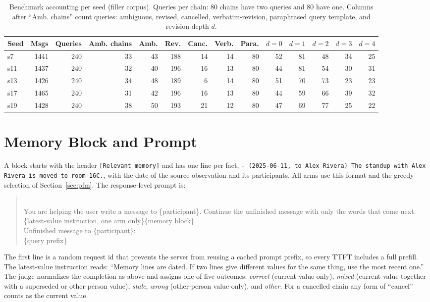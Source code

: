 \documentclass{article} %
\begin{document}
\begin{table}[h]
\centering
\scriptsize
\setlength{\tabcolsep}{3pt}
\begin{tabular}{@{}lrrrrrrrrrrrrr@{}}
\toprule
Seed & Msgs & Queries & Amb. chains & Amb. & Rev. & Canc. & Verb. & Para. & $d{=}0$ & $d{=}1$ & $d{=}2$ & $d{=}3$ & $d{=}4$ \\
\midrule
s7 & 1441 & 240 & 33 & 43 & 188 & 14 & 14 & 80 & 52 & 81 & 48 & 34 & 25 \\
s11 & 1437 & 240 & 32 & 40 & 196 & 16 & 13 & 80 & 44 & 81 & 54 & 30 & 31 \\
s13 & 1426 & 240 & 34 & 48 & 189 & 6 & 14 & 80 & 51 & 70 & 73 & 23 & 23 \\
s17 & 1465 & 240 & 31 & 42 & 196 & 16 & 13 & 80 & 44 & 59 & 66 & 39 & 32 \\
s19 & 1428 & 240 & 38 & 50 & 193 & 21 & 12 & 80 & 47 & 69 & 77 & 25 & 22 \\
\bottomrule
\end{tabular}
\caption{Benchmark accounting per seed (filler corpus). Queries per chain: 80 chains have two queries and 80 have one. Columns after ``Amb. chains'' count queries: ambiguous, revised, cancelled, verbatim-revision, paraphrased query template, and revision depth $d$.}
\label{tab:counts}
\end{table}
\section{Memory Block and Prompt}
\label{app:prompt}

A block starts with the header \texttt{[Relevant memory]} and has one line per fact, \texttt{- (2025-06-11, to Alex Rivera) The standup with Alex Rivera is moved to room 16C.}, with the date of the source observation and its participants. All arms use this format and the greedy selection of Section~\ref{sec:pfm}. The response-level prompt is:

\begin{quote}\small\ttfamily
[request 1804289383]\\
You are helping the user write a message to \{participant\}. Continue the unfinished message with only the words that come next.\\[2pt]
\{latest-value instruction, one arm only\}\{memory block\}\\[2pt]
Unfinished message to \{participant\}:\\
\{query prefix\}
\end{quote}

The first line is a random request id that prevents the server from reusing a cached prompt prefix, so every TTFT includes a full prefill. The latest-value instruction reads: ``Memory lines are dated. If two lines give different values for the same thing, use the most recent one.'' The judge normalizes the completion as above and assigns one of five outcomes: \emph{correct} (current value only), \emph{mixed} (current value together with a superseded or other-person value), \emph{stale}, \emph{wrong} (other-person value only), and \emph{other}. For a cancelled chain any form of ``cancel'' counts as the current value.
\end{document}
